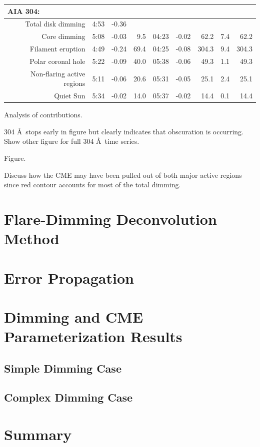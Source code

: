 \begin{table}
\begin{center}
\begin{tabular}{r|rrr|rrr|r@{-}r}
\multicolumn{1}{l}{AIA 304:} \\
\hline
Total disk dimming & 4:53 & -0.36 & & & & & \\
Core dimming & 5:08 & -0.03 & 9.5 & 04:23 & -0.02 & 62.2 &  7.4 & 62.2 \\
Filament eruption & 4:49 & -0.24 & 69.4 & 04:25 & -0.08 & 304.3 &  9.4 & 304.3 \\
Polar coronal hole & 5:22 & -0.09 & 40.0 & 05:38 & -0.06 & 49.3 &  1.1 & 49.3 \\
Non-flaring active regions & 5:11 & -0.06 & 20.6 & 05:31 & -0.05 & 25.1 &  2.4 & 25.1 \\
Quiet Sun & 5:34 & -0.02 & 14.0 & 05:37 & -0.02 & 14.4 &  0.1 & 14.4 \\
\hline
\end{tabular}
\end{center}
\label{tab:aia2011aug4}
\end{table}

Analysis of contributions. 

304 \AA\ stops early in figure but clearly indicates that obscuration is occurring. Show other figure for full 304 \AA\ time series. 

Figure. 

Discuss how the CME may have been pulled out of both major active regions since red contour accounts for most of the total dimming. 


\section{Flare-Dimming Deconvolution Method}
\label{sec:deconvolve}

\section{Error Propagation}
\label{sec:deconvolveerrors}

\section{Dimming and CME Parameterization Results}
\label{sec:casestudyresults}

\subsection{Simple Dimming Case}

\subsection{Complex Dimming Case}

\section{Summary}
